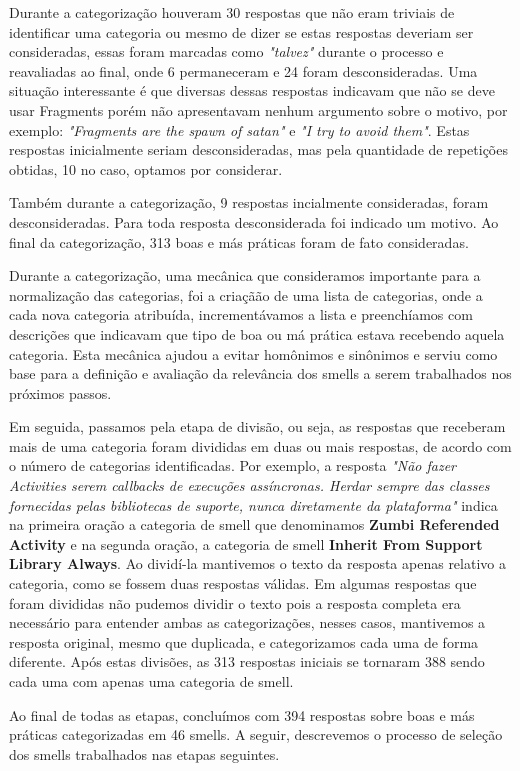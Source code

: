 Durante a categoriza\c{c}\~ao houveram 30 respostas que n\~ao eram triviais de identificar uma categoria ou mesmo de dizer se estas respostas deveriam ser consideradas, essas foram marcadas como \textit{"talvez"} durante o processo e reavaliadas ao final, onde 6 permaneceram e 24 foram desconsideradas. Uma situa\c{c}\~ao interessante \'e que diversas dessas respostas indicavam que n\~ao se deve usar Fragments por\'em n\~ao apresentavam nenhum argumento sobre o motivo, por exemplo: \textit{"Fragments are the spawn of satan"} e \textit{"I try to avoid them"}. Estas respostas inicialmente seriam desconsideradas, mas pela quantidade de repeti\c{c}\~oes obtidas, 10 no caso, optamos por considerar.

Tamb\'em durante a categoriza\c{c}\~ao, 9 respostas incialmente consideradas, foram desconsideradas. Para toda resposta desconsiderada foi indicado um motivo. Ao final da categoriza\c{c}\~ao, 313 boas e m\'as pr\'aticas foram de fato consideradas.

Durante a categoriza\c{c}\~ao, uma mec\^anica que consideramos importante para a normaliza\c{c}\~ao das categorias, foi a cria\c{c}ã\~ao de uma lista de categorias, onde a cada nova categoria atribu\'ida, increment\'avamos a lista e preench\'iamos com descri\c{c}\~oes que indicavam que tipo de boa ou m\'a pr\'atica estava recebendo aquela categoria. Esta mec\^anica ajudou a evitar hom\^onimos e sin\^onimos e serviu como base para a defini\c{c}\~ao e avalia\c{c}\~ao da relev\^ancia dos smells a serem trabalhados nos pr\'oximos passos.

Em seguida, passamos pela etapa de divis\~ao, ou seja, as respostas que receberam mais de uma categoria foram divididas em duas ou mais respostas, de acordo com o n\'umero de categorias identificadas. Por exemplo, a resposta \textit{"N\~ao fazer Activities serem callbacks de execu\c{c}\~oes ass\'incronas. Herdar sempre das classes fornecidas pelas bibliotecas de suporte, nunca diretamente da plataforma"} indica na primeira ora\c{c}\~ao a categoria de smell que denominamos \textbf{Zumbi Referended Activity} e na segunda ora\c{c}\~ao, a categoria de smell \textbf{Inherit From Support Library Always}. Ao divid\'i-la mantivemos o texto da resposta apenas relativo a categoria, como se fossem duas respostas v\'alidas. Em algumas respostas que foram divididas n\~ao pudemos dividir o texto pois a resposta completa era necess\'ario para entender ambas as categoriza\c{c}\~oes, nesses casos, mantivemos a resposta original, mesmo que duplicada, e categorizamos cada uma de forma diferente. Ap\'os estas divis\~oes, as 313 respostas iniciais se tornaram 388 sendo cada uma com apenas uma categoria de smell. 

Ao final de todas as etapas, conclu\'imos com 394 respostas sobre boas e m\'as pr\'aticas categorizadas em 46 smells. A seguir, descrevemos o processo de sele\c{c}\~ao dos smells trabalhados nas etapas seguintes. 